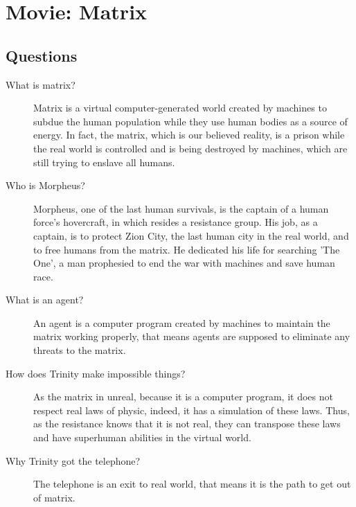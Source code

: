 \documentclass[a4paper,12pt]{article}
\begin{document}
\titleTMB 
\newpage
{} %


\section*{Movie: Matrix}
\subsection*{Questions}

\begin{description}

\item[What is matrix?]
  {
    Matrix is a virtual computer-generated world created by machines to subdue
    the human population while they use human bodies as a source of energy. In
    fact, the matrix, which is our believed reality, is a prison while the real 
    world  is controlled and  is being  destroyed by  machines, which  are still
    trying to enslave all humans.
  }
  
\item[Who is Morpheus?]{
    Morpheus, one  of the last human survivals,  is the captain of  a human force's
    hovercraft, in which resides a resistance group. His job, as a captain, is to protect Zion City, the last human city
    in the real world, and to free humans from the matrix. He dedicated his life
    for searching 'The One', a man prophesied to end the war with machines and save human race.
  }
  
\item[What is an agent?]
  {
    An agent  is a computer program created by machines to
    maintain the matrix working properly, that means agents are supposed to eliminate any threats to the matrix.
  }


\item[How does Trinity make impossible things?]{ As the matrix in unreal, because it
    is a computer program, it does not respect real laws of physic, indeed, it has
    a simulation of these laws. Thus, as the resistance knows that it is not real,
    they can transpose these laws and have superhuman abilities in the virtual world.
  }

\item[Why Trinity got the telephone?]{
    The telephone is an exit to real world, that means it is the path to get out
    of matrix.
  }


\end{description}
\end{document}
